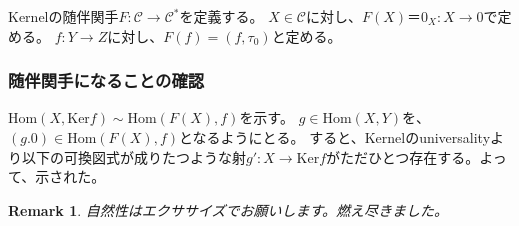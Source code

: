 \documentclass{ujarticle}
\newtheorem*{rem}{Remark}
\begin{document}
Kernelの随伴関手$F:\mathcal{C} \to \mathcal{C}^*$を定義する。
$X \in \mathcal{C}$に対し、$F(X)＝0_X:X \to 0$で定める。
$f:Y \to Z$に対し、$F(f)= (f,\tau_{0})$と定める。



\subsubsection{随伴関手になることの確認}
\label{subs:随伴関手になることの確認}

$\mathrm{Hom}(X,\mathrm{Ker}f) \sim \mathrm{Hom}(F(X),f)$を示す。
$g \in \mathrm{Hom}(X,Y)$を、$(g.0) \in \mathrm{Hom}(F(X),f)$となるようにとる。
すると、Kernelのuniversalityより以下の可換図式が成りたつような射$g':X \to \mathrm{Ker}f$がただひとつ存在する。よって、示された。


\begin{rem}
 自然性はエクササイズでお願いします。燃え尽きました。
\end{rem}
\end{document}
